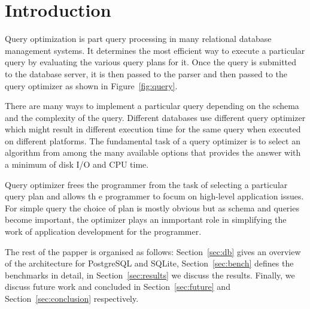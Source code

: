 
\section{Introduction}
\label{sec:intro}


Query optimization is part query processing in many relational database management systems. It determines the most efficient way to execute a particular query by evaluating the various query plans for it. Once the query is submitted to the database server, it is then passed to the parser and then passed to the query optimizer as shown in Figure~\ref{fig:query}.

There are many ways to implement a particular query depending on the schema and the complexity of the query. Different databases use different query optimizer which might result in different execution time for the same query when executed on different platforms. The fundamental task of a query optimizer is to select an algorithm from among the many available options that provides the answer with a minimum of disk I/O and CPU time.

Query optimizer frees the programmer from the task of selecting a particular query plan and allows th e programmer to focum on high-level application issues. For simple query the choice of plan is mostly obvious but as schema and queries become important, the optimizer plays an inmportant role in simplifying the work of application development for the programmer.

The rest of the papper is organised as follows: Section~\ref{sec:db} gives an overview of the architecture for PostgreSQL and SQLite, Section~\ref{sec:bench} defines the benchmarks in detail, in Section~\ref{sec:results} we discuss the results. Finally, we discuss future work and concluded in Section~\ref{sec:future} and Section~\ref{sec:conclusion} respectively. 



